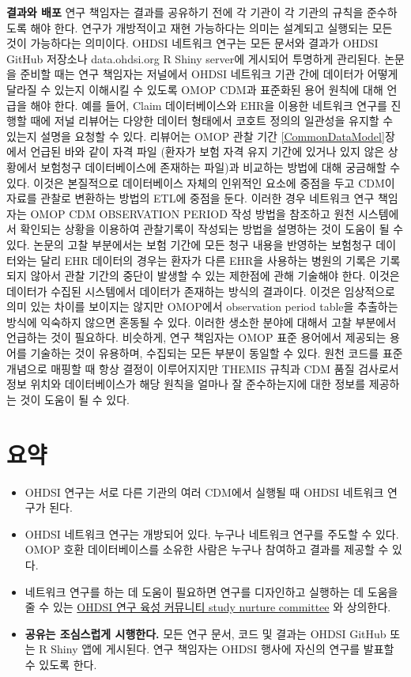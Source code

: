 \documentclass[10.5pt]{book}
\providecommand{\tightlist}{%
  \setlength{\itemsep}{0pt}\setlength{\parskip}{0pt}}
\theoremstyle{definition}
\theoremstyle{definition}
\theoremstyle{definition}
\theoremstyle{remark}
\let\BeginKnitrBlock\begin \let\EndKnitrBlock\end
\begin{document}
\textbf{결과와 배포} 연구 책임자는 결과를 공유하기 전에 각 기관이 각
기관의 규칙을 준수하도록 해야 한다. 연구가 개방적이고 재현 가능하다는
의미는 설계되고 실행되는 모든 것이 가능하다는 의미이다. OHDSI 네트워크
연구는 모든 문서와 결과가 OHDSI GitHub 저장소나 data.ohdsi.org R Shiny
server에 게시되어 투명하게 관리된다. 논문을 준비할 때는 연구 책임자는
저널에서 OHDSI 네트워크 기관 간에 데이터가 어떻게 달라질 수 있는지
이해시킬 수 있도록 OMOP CDM과 표준화된 용어 원칙에 대해 언급을 해야
한다. 예를 들어, Claim 데이터베이스와 EHR을 이용한 네트워크 연구를
진행할 때에 저널 리뷰어는 다양한 데이터 형태에서 코호트 정의의 일관성을
유지할 수 있는지 설명을 요청할 수 있다. 리뷰어는 OMOP 관찰 기간
\ref{CommonDataModel}장에서 언급된 바와 같이 자격 파일 (환자가 보험 자격
유지 기간에 있거나 있지 않은 상황에서 보험청구 데이터베이스에 존재하는
파일)과 비교하는 방법에 대해 궁금해할 수 있다. 이것은 본질적으로
데이터베이스 자체의 인위적인 요소에 중점을 두고 CDM이 자료를 관찰로
변환하는 방법의 ETL에 중점을 둔다. 이러한 경우 네트워크 연구 책임자는
OMOP CDM OBSERVATION PERIOD 작성 방법을 참조하고 원천 시스템에서
확인되는 상황을 이용하여 관찰기록이 작성되는 방법을 설명하는 것이 도움이
될 수 있다. 논문의 고찰 부분에서는 보험 기간에 모든 청구 내용을 반영하는
보험청구 데이터와는 달리 EHR 데이터의 경우는 환자가 다른 EHR을 사용하는
병원의 기록은 기록되지 않아서 관찰 기간의 중단이 발생할 수 있는 제한점에
관해 기술해야 한다. 이것은 데이터가 수집된 시스템에서 데이터가 존재하는
방식의 결과이다. 이것은 임상적으로 의미 있는 차이를 보이지는 않지만
OMOP에서 observation period table을 추출하는 방식에 익숙하지 않으면
혼동될 수 있다. 이러한 생소한 분야에 대해서 고찰 부분에서 언급하는 것이
필요하다. 비슷하게, 연구 책임자는 OMOP 표준 용어에서 제공되는 용어를
기술하는 것이 유용하며, 수집되는 모든 부분이 동일할 수 있다. 원천 코드를
표준 개념으로 매핑할 때 항상 결정이 이루어지지만 THEMIS 규칙과 CDM 품질
검사로서 정보 위치와 데이터베이스가 해당 원칙을 얼마나 잘 준수하는지에
대한 정보를 제공하는 것이 도움이 될 수 있다.

\section{요약}\label{-18}

\BeginKnitrBlock{rmdsummary}
\begin{itemize}
\tightlist
\item
  OHDSI 연구는 서로 다른 기관의 여러 CDM에서 실행될 때 OHDSI 네트워크
  연구가 된다.
\item
  OHDSI 네트워크 연구는 개방되어 있다. 누구나 네트워크 연구를 주도할 수
  있다. OMOP 호환 데이터베이스를 소유한 사람은 누구나 참여하고 결과를
  제공할 수 있다.
\item
  네트워크 연구를 하는 데 도움이 필요하면 연구를 디자인하고 실행하는 데
  도움을 줄 수 있는
  \href{https://github.com/ohdsistudynurture/OhdsiStudyNurtureCommittee/wiki}{OHDSI
  연구 육성 커뮤니티 study nurture committee} 와 상의한다.
\item
  \textbf{공유는 조심스럽게 시행한다.} 모든 연구 문서, 코드 및 결과는
  OHDSI GitHub 또는 R Shiny 앱에 게시된다. 연구 책임자는 OHDSI 행사에
  자신의 연구를 발표할 수 있도록 한다.
\end{itemize}
\EndKnitrBlock{rmdsummary}
\end{document}
